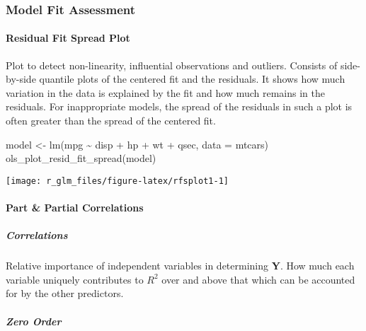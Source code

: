\documentclass[
]{article}
\newenvironment{Shaded}{\begin{snugshade}}{\end{snugshade}}
\newcommand{\AttributeTok}[1]{\textcolor[rgb]{0.77,0.63,0.00}{#1}}
\newcommand{\FunctionTok}[1]{\textcolor[rgb]{0.00,0.00,0.00}{#1}}
\newcommand{\NormalTok}[1]{#1}
\newcommand{\OtherTok}[1]{\textcolor[rgb]{0.56,0.35,0.01}{#1}}
\newcommand{\SpecialCharTok}[1]{\textcolor[rgb]{0.00,0.00,0.00}{#1}}
\begin{document}
\hypertarget{model-fit-assessment}{%
\subsubsection{Model Fit Assessment}\label{model-fit-assessment}}

\hypertarget{residual-fit-spread-plot-1}{%
\paragraph{Residual Fit Spread Plot}\label{residual-fit-spread-plot-1}}

Plot to detect non-linearity, influential observations and outliers.
Consists of side-by-side quantile plots of the centered fit and the
residuals. It shows how much variation in the data is explained by the
fit and how much remains in the residuals. For inappropriate models, the
spread of the residuals in such a plot is often greater than the spread
of the centered fit.

\begin{Shaded}
\begin{Highlighting}[]
\NormalTok{model }\OtherTok{\textless{}{-}} \FunctionTok{lm}\NormalTok{(mpg }\SpecialCharTok{\textasciitilde{}}\NormalTok{ disp }\SpecialCharTok{+}\NormalTok{ hp }\SpecialCharTok{+}\NormalTok{ wt }\SpecialCharTok{+}\NormalTok{ qsec, }\AttributeTok{data =}\NormalTok{ mtcars)}
\FunctionTok{ols\_plot\_resid\_fit\_spread}\NormalTok{(model)}
\end{Highlighting}
\end{Shaded}

\begin{center}\texttt{[image: r\_glm\_files/figure-latex/rfsplot1-1]} \end{center}

\hypertarget{part-partial-correlations}{%
\paragraph{Part \& Partial
Correlations}\label{part-partial-correlations}}

\hypertarget{correlations}{%
\subparagraph{Correlations}\label{correlations}}

Relative importance of independent variables in determining \textbf{Y}.
How much each variable uniquely contributes to \(R^{2}\) over and above
that which can be accounted for by the other predictors.

\hypertarget{zero-order}{%
\subparagraph{Zero Order}\label{zero-order}}
\end{document}
